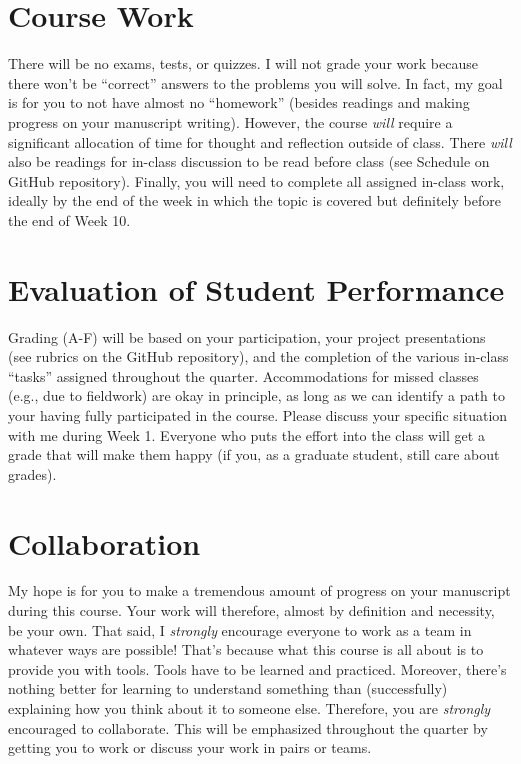 \documentclass[10pt]{article}
\begin{document}

\section*{Course Work}
There will be no exams, tests, or quizzes.
I will not grade your work because there won't be ``correct'' answers to the 
problems you will solve.
In fact, my goal is for you to not have almost no ``homework'' (besides readings 
and making progress on your manuscript writing).
However, the course \textit{will} require a significant allocation of time for 
thought and reflection outside of class.
There \textit{will} also be readings for in-class discussion to be read before class (see Schedule on GitHub repository).
Finally, you will need to complete all assigned in-class work, ideally by the end 
of the week in which the topic is covered but definitely before the end of Week 
10.

\section*{Evaluation of Student Performance}
Grading (A-F) will be based on your participation, your project presentations 
(see rubrics on the GitHub repository),
and the completion of the various in-class ``tasks'' assigned throughout the quarter.
Accommodations for missed classes (e.g., due to fieldwork) are okay in principle, as long as we can identify a path to your having fully participated in the course.
Please discuss your specific situation with me during Week 1.
Everyone who puts the effort into the class will get a grade that will make them happy (if you, as a graduate student, still care about grades).

\section*{Collaboration}
My hope is for you to make a tremendous amount of progress on your 
manuscript during this course.
Your work will therefore, almost by definition and necessity, be your own.
That said, I \textit{strongly} encourage everyone to work as a team in
whatever ways are possible!
That's because what this course is all about is to provide you with tools.
Tools have to be learned and practiced.
Moreover, there's nothing better for learning to understand something than 
(successfully) explaining how you think about it to someone else.
Therefore, you are \textit{strongly} encouraged to collaborate.
This will be emphasized throughout the quarter by getting you to work or 
discuss your work in pairs or teams.
\end{document}
